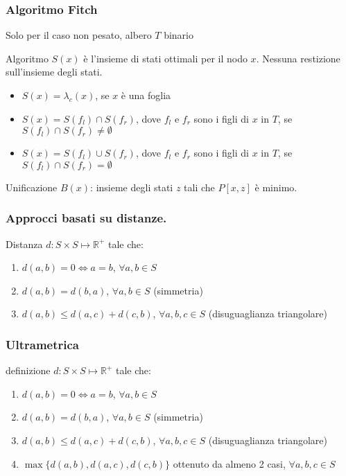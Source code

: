 \begin{frame}[fragile]
\frametitle{Algoritmo Fitch}
Solo per il caso non pesato, albero $T$ binario
\begin{block}{Algoritmo}
$S(x)$ è l'insieme di stati ottimali per il nodo $x$. Nessuna restizione sull'insieme degli stati.


\begin{itemize}
\item
$S(x)=\lambda_{c}(x)$, se $x$ è una foglia
\item
$S(x)= S(f_{l}) \cap S(f_{r})$, dove $f_{l}$ e $f_{r}$ sono i figli di $x$ in $T$,
se $S(f_{l}) \cap S(f_{r})\neq \emptyset$
\item
$S(x)= S(f_{l}) \cup S(f_{r})$, dove $f_{l}$ e $f_{r}$ sono i figli di $x$ in $T$,
se $S(f_{l}) \cap S(f_{r}) = \emptyset$
\end{itemize}
\end{block}
\begin{block}{Unificazione}
$B(x)$: insieme degli stati $z$ tali che $P[x,z]$ è minimo.
\end{block}
\end{frame}

\begin{frame}[fragile]
\frametitle{Approcci basati su distanze.}
\begin{block}{Distanza}
$d: S \times S \mapsto \mathbb{R}^{+}$ tale che:
\begin{enumerate}
\item
$d(a,b) = 0 \Leftrightarrow a=b$, $\forall a,b\in S$
\item
$d(a,b) = d(b,a)$, $\forall a,b\in S$ (simmetria)
\item
$d(a,b) \le d(a,c) + d(c,b)$, $\forall a,b,c\in S$ (disuguaglianza triangolare)
\end{enumerate}
\end{block}
\end{frame}

\begin{frame}[fragile]
\frametitle{Ultrametrica}
\begin{block}{definizione}
$d: S \times S \mapsto \mathbb{R}^{+}$ tale che:
\begin{enumerate}
\item
$d(a,b) = 0 \Leftrightarrow a=b$, $\forall a,b\in S$
\item
$d(a,b) = d(b,a)$, $\forall a,b\in S$ (simmetria)
\item
$d(a,b) \le d(a,c) + d(c,b)$, $\forall a,b,c\in S$ (disuguaglianza triangolare)
\item
$\max\{d(a,b), d(a,c), d(c,b) \}$ ottenuto da almeno 2 casi, $\forall a,b,c\in S$
\end{enumerate}
\end{block}
\end{frame}



